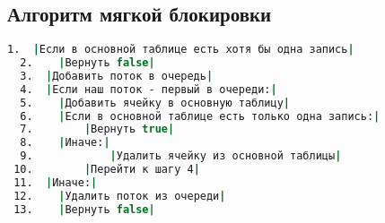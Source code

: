 \subsection{Алгоритм мягкой блокировки}

\begin{lstlisting}[language=csh,caption={Алгоритм Cassandra.TryGetLock(lockId, threadId)}]
  1.  |Если в основной таблице есть хотя бы одна запись|
  2.  	|Вернуть false|
  3.  |Добавить поток в очередь|
  4.  |Если наш поток - первый в очереди:|
  5.  	|Добавить ячейку в основную таблицу|
  6.  	|Если в основной таблице есть только одна запись:|
  7.  		|Вернуть true|
  8.  	|Иначе:|
  9.  			|Удалить ячейку из основной таблицы|
 10.  		|Перейти к шагу 4|
 11.  |Иначе:|
 12.  	|Удалить поток из очереди|
 13.  	|Вернуть false|
\end{lstlisting}